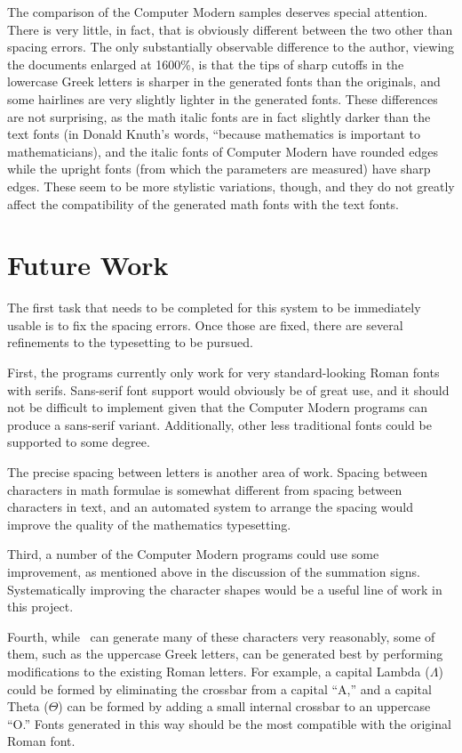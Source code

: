 \documentclass[12pt]{article}
\begin{document}
The comparison of the Computer Modern samples deserves special attention. There
is very little, in fact, that is obviously different between the two other than
spacing errors. The only substantially observable difference to the author,
viewing the documents enlarged at 1600\%, is that the tips of sharp cutoffs in
the lowercase Greek letters is sharper in the generated fonts than the
originals, and some hairlines are very slightly lighter in the generated fonts.
These differences are not surprising, as the math italic fonts are in fact
slightly darker than the text fonts (in Donald Knuth's words, ``because
mathematics is important to mathematicians), and the italic fonts of Computer
Modern have rounded edges while the upright fonts (from which the parameters are
measured) have sharp edges. These seem to be more stylistic variations, though,
and they do not greatly affect the compatibility of the generated math fonts
with the text fonts.

\section{Future Work}

The first task that needs to be completed for this system to be immediately
usable is to fix the spacing errors. Once those are fixed, there are several
refinements to the typesetting to be pursued.

First, the programs currently only work for very standard-looking Roman fonts
with serifs. Sans-serif font support would obviously be of great use, and it
should not be difficult to implement given that the Computer Modern programs
can produce a sans-serif variant. Additionally, other less traditional fonts
could be supported to some degree.

The precise spacing between letters is another area of work. Spacing between
characters in math formulae is somewhat different from spacing between
characters in text, and an automated system to arrange the spacing would improve
the quality of the mathematics typesetting.

Third, a number of the Computer Modern programs could use some improvement, as
mentioned above in the discussion of the summation signs. Systematically
improving the character shapes would be a useful line of work in this project.

Fourth, while \MF\ can generate many of these characters very reasonably, some
of them, such as the uppercase Greek letters, can be generated best by
performing modifications to the existing Roman letters. For example, a capital
Lambda ($\Lambda$) could be formed by eliminating the crossbar from a capital
``A,'' and a capital Theta ($\Theta$) can be formed by adding a small internal
crossbar to an uppercase ``O.'' Fonts generated in this way should be the most
compatible with the original Roman font.
\end{document}
